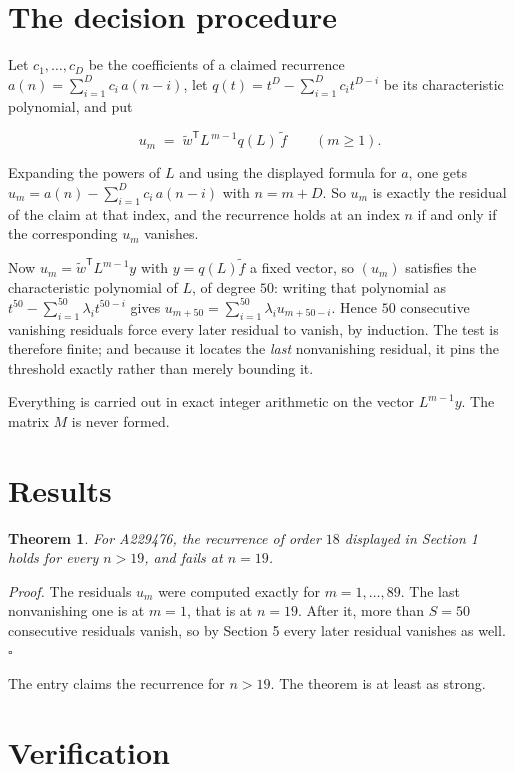 \documentclass[11pt]{article}
\newtheorem{theorem}{Theorem}
\theoremstyle{definition}
\begin{document}
\section{The decision procedure}

Let $c_1,\dots,c_D$ be the coefficients of a claimed recurrence $a(n) = \sum_{i=1}^{D} c_i\,a(n-i)$, let $q(t) = t^{D} - \sum_{i=1}^{D} c_i t^{D-i}$ be its characteristic polynomial, and put

\[u_m \;=\; \tilde w^{\mathsf T} L^{\,m-1} q(L)\,\tilde f \qquad (m \ge 1).\]

Expanding the powers of $L$ and using the displayed formula for $a$, one gets $u_m = a(n) - \sum_{i=1}^{D} c_i\,a(n-i)$ with $n = m + D$. So $u_m$ is exactly the residual of the claim at that index, and the recurrence holds at an index $n$ if and only if the corresponding $u_m$ vanishes.

Now $u_m = \tilde w^{\mathsf T} L^{m-1} y$ with $y = q(L)\tilde f$ a fixed vector, so $(u_m)$ satisfies the characteristic polynomial of $L$, of degree $50$: writing that polynomial as $t^{50} - \sum_{i=1}^{50} \lambda_i t^{50-i}$ gives $u_{m+50} = \sum_{i=1}^{50} \lambda_i u_{m+50-i}$. Hence $50$ consecutive vanishing residuals force every later residual to vanish, by induction. The test is therefore finite; and because it locates the {\itshape last} nonvanishing residual, it pins the threshold exactly rather than merely bounding it.

Everything is carried out in exact integer arithmetic on the vector $L^{m-1}y$. The matrix $M$ is never formed.

\section{Results}

\begin{theorem} For A229476, the recurrence of order $18$ displayed in Section 1 holds for every $n > 19$, and fails at $n = 19$.\end{theorem}

{\itshape Proof.} The residuals $u_m$ were computed exactly for $m = 1,\dots,89$. The last nonvanishing one is at $m = 1$, that is at $n = 19$. After it, more than $S = 50$ consecutive residuals vanish, so by Section 5 every later residual vanishes as well. $\square$

The entry claims the recurrence for $n > 19$. The theorem is at least as strong.

\section{Verification}
\end{document}
